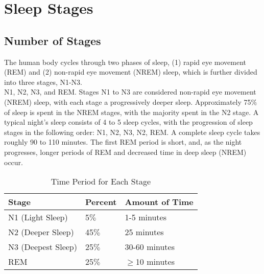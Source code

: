 \section{Sleep Stages}

\subsection{Number of Stages}
The human body cycles through two phases of sleep, (1) rapid eye movement (REM) and (2) non-rapid eye movement (NREM) sleep, which is further divided into three stages, N1-N3.\\[0.5cm]
N1, N2, N3, and REM. Stages N1 to N3 are considered non-rapid eye movement (NREM) sleep, with each stage a progressively deeper sleep. Approximately 75$\%$ of sleep is spent in the NREM stages, with the majority spent in the N2 stage. A typical night's sleep consists of 4 to 5 sleep cycles, with the progression of sleep stages in the following order: N1, N2, N3, N2, REM. A complete sleep cycle takes roughly 90 to 110 minutes. The first REM period is short, and, as the night progresses, longer periods of REM and decreased time in deep sleep (NREM) occur.\cite{4stage}

\begin{table}[H]
\centering
\begin{tabular}{|l|l|l|}
\hline
\textbf{Stage} & \textbf{Percent} & \textbf{Amount of Time}\\ \hline
N1 (Light Sleep) & 5$\%$ & 1-5 minutes\\ \hline
N2 (Deeper Sleep) & 45$\%$ & 25 minutes \\ \hline
N3 (Deepest Sleep) & 25$\%$ & 30-60 minutes \\ \hline
REM & 25$\%$ & $\geq$10 minutes \\ \hline
\end{tabular}
\caption{Time Period for Each Stage}
\label{tab:my_label_with_H_tag}
\end{table}


